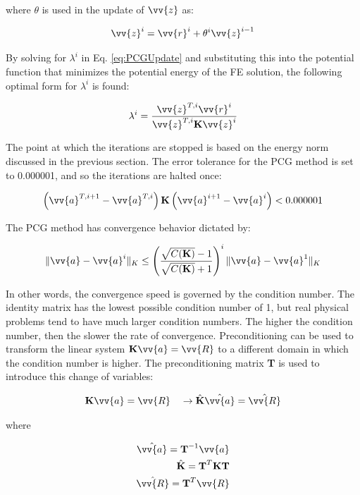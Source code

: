 \documentclass[10pt]{article}
\begin{document}
where \(\theta\) is used in the update of \(\vv{z}\) as:

\begin{equation}
\vv{z}^i=\vv{r}^i+\theta^i\vv{z}^{i-1}
\end{equation}

By solving for \(\lambda^i\) in Eq. \eqref{eq:PCGUpdate} and substituting this into the potential function that minimizes the potential energy of the FE solution, the following optimal form for \(\lambda^i\) is found:

\begin{equation}
\lambda^i=\frac{\vv{z}^{T,i}\vv{r}^i}{\vv{z}^{T,i}\textbf{K}\vv{z}^i}
\end{equation}

The point at which the iterations are stopped is based on the energy norm discussed in the previous section. The error tolerance for the PCG method is set to 0.000001, and so the iterations are halted once:

\begin{equation}
\left(\vv{a}^{T,i+1}-\vv{a}^{T,i}\right)\textbf{K}\left(\vv{a}^{i+1}-\vv{a}^i\right)<0.000001
\end{equation}

The PCG method has convergence behavior dictated by:

\begin{equation}
\|\vv{a}-\vv{a}^{i}\|_K\leq\left(\frac{\sqrt{C(\textbf{K})}-1}{\sqrt{C(\textbf{K})}+1}\right)^i\|\vv{a}-\vv{a}^1\|_K
\end{equation}

In other words, the convergence speed is governed by the condition number. The identity matrix has the lowest possible condition number of 1, but real physical problems tend to have much larger condition numbers. The higher the condition number, then the slower the rate of convergence. Preconditioning can be used to transform the linear system \(\textbf{K}\vv{a}=\vv{R}\) to a different domain in which the condition number is higher. The preconditioning matrix \textbf{T} is used to introduce this change of variables:

\begin{equation}
\label{eq:Transformation}
\textbf{K}\vv{a}=\vv{R}\quad\rightarrow\hat{\textbf{K}}\hat{\vv{a}}=\hat{\vv{R}}
\end{equation}

where

\begin{equation}
\label{eq:TransformationSpecs}
\begin{aligned}
\hat{\vv{a}}=\textbf{T}^{-1}\vv{a}\\
\hat{\textbf{K}}=\textbf{T}^{T}\textbf{K}\textbf{T}\\
\hat{\vv{R}}=\textbf{T}^T\vv{R}\\
\end{aligned}
\end{equation}
\end{document}
